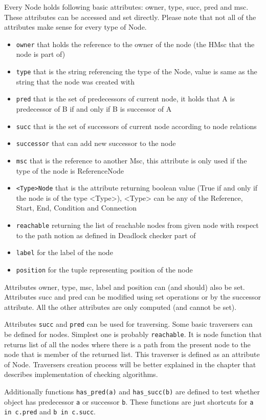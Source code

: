 \documentclass[11pt,oneside]{fithesis2}
\newcommand{\T}[1]{\texttt{#1}}
\newcommand{\ite}[1]{\item{\texttt{#1}}}
\begin{document}
Every Node holds following basic attributes: owner, type, succ, pred and msc. These attributes can be accessed and set directly. Please note that not all of the attributes make sense for every type of Node.
\begin{itemize}
\item{\texttt{owner}} that holds the reference to the owner of the node (the HMsc that the node is part of)
\item{\texttt{type}} that is the string referencing the type of the Node, value is same as the string that the node was created with
\item{\texttt{pred}} that is the set of predecessors of current node, it holds that A is predecessor of B if and only if B is successor of A
\item{\texttt{succ}} that is the set of successors of current node according to node relations
\ite{successor} that can add new successor to the node
\item{\texttt{msc}} that is the reference to another Msc, this attribute is only used if the type of the node is ReferenceNode
\ite{<Type>Node} that is the attribute returning boolean value (True if and only if the node is of the type <Type>), <Type> can be any of the Reference, Start, End, Condition and Connection
\ite{reachable} returning the list of reachable nodes from given node with respect to the path notion as defined in Deadlock checker part of \cite{babica}
\ite{label} for the label of the node
\ite{position} for the tuple representing position of the node
\end{itemize}

Attributes owner, type, msc, label and position can (and should) also be set. Attributes succ and pred can be modified using set operations or by the successor attribute. All the other attributes are only computed (and cannot be set).

Attributes \T{succ} and \T{pred} can be used for traversing. Some basic traversers can be defined for nodes. Simplest one is probably \T{reachable}. It is node function that returns list of all the nodes where there is a path from the present node to the node that is member of the returned list. This traverser is defined as an attribute of Node. Traversers creation process will be better explained in the chapter that describes implementation of checking algorithms.

Additionally functions \T{has\_pred(a)} and \T{has\_succ(b)} are defined to test whether object has predecessor \T{a} or successor \T{b}. These functions are just shortcuts for \T{a in c.pred} and \T{b in c.succ}.
\end{document}

